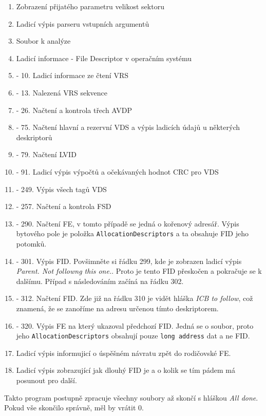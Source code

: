\begin{enumerate}
    \item Zobrazení přijatého parametru velikost sektoru
    \item Ladicí výpis parseru vstupních argumentů
    \item Soubor k analýze
    \item Ladicí informace - File Descriptor v operačním systému
    \item - 10. Ladicí informace ze čtení VRS \addtocounter{enumi}{5}
    \item - 13. Nalezená VRS sekvence \addtocounter{enumi}{2}
    \item - 26. Načtení a kontrola třech AVDP \addtocounter{enumi}{12}
    \item - 75. Načtení hlavní a rezervní VDS a výpis ladicích údajů u některých deskriptorů \addtocounter{enumi}{48}
    \item - 79. Načtení LVID \addtocounter{enumi}{3}
    \item - 91. Ladicí výpis výpočtů a očekávaných hodnot CRC pro VDS \addtocounter{enumi}{11}
    \item - 249. Výpis všech tagů VDS \addtocounter{enumi}{157}
    \item - 257. Načtení a kontrola FSD \addtocounter{enumi}{7}
    \item - 290. Načtení FE, v tomto případě se jedná o kořenový adresář. Výpis bytového pole je položka \texttt{AllocationDescriptors} a ta obsahuje FID jeho potomků. \addtocounter{enumi}{32}
    \item - 301. Výpis FID. Povšimněte si řádku 299, kde je zobrazen ladicí výpis \textit{Parent. Not followng this one.}. Proto je tento FID přeskočen a pokračuje se k dalšímu. Případ s následováním začíná na řádku 302. \addtocounter{enumi}{10}
    \item - 312. Načtení FID. Zde již na řádku 310 je vidět hláška \textit{ICB to follow}, což znamená, že se zanoříme na adresu určenou tímto deskriptorem. \addtocounter{enumi}{10}
    \item - 320. Výpis FE na který ukazoval předchozí FID. Jedná se o soubor, proto jeho \texttt{AllocationDescriptors} obsahují pouze \texttt{long address} dat a ne FID. \addtocounter{enumi}{7}
    \item Ladicí výpis informujicí o úspěšném návratu zpět do rodičovské FE.
    \item Ladicí výpis zobrazující jak dlouhý FID je a o kolik se tím pádem má posunout pro další.
\end{enumerate}
Takto program postupně zpracuje všechny soubory až skončí s hláškou \textit{All done}. Pokud vše skončilo správně, měl by vrátit 0.
\iffalse
